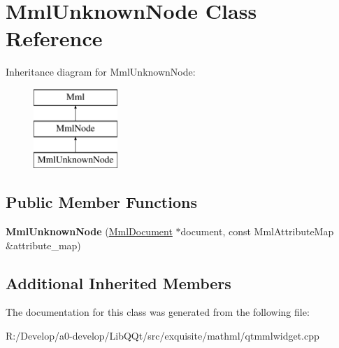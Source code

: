\hypertarget{class_mml_unknown_node}{}\section{Mml\+Unknown\+Node Class Reference}
\label{class_mml_unknown_node}
Inheritance diagram for Mml\+Unknown\+Node\+:\begin{figure}[H]
\begin{center}
\leavevmode
\includegraphics[height=3.000000cm]{class_mml_unknown_node}
\end{center}
\end{figure}
\subsection*{Public Member Functions}
\begin{DoxyCompactItemize}
\item 
\mbox{\label{class_mml_unknown_node_adb9ed3ac53de2433479926616400347e}} 
{\bfseries Mml\+Unknown\+Node} (\mbox{\hyperlink{class_mml_document}{Mml\+Document}} $\ast$document, const Mml\+Attribute\+Map \&attribute\+\_\+map)
\end{DoxyCompactItemize}
\subsection*{Additional Inherited Members}


The documentation for this class was generated from the following file\+:\begin{DoxyCompactItemize}
\item 
R\+:/\+Develop/a0-\/develop/\+Lib\+Q\+Qt/src/exquisite/mathml/qtmmlwidget.\+cpp\end{DoxyCompactItemize}
